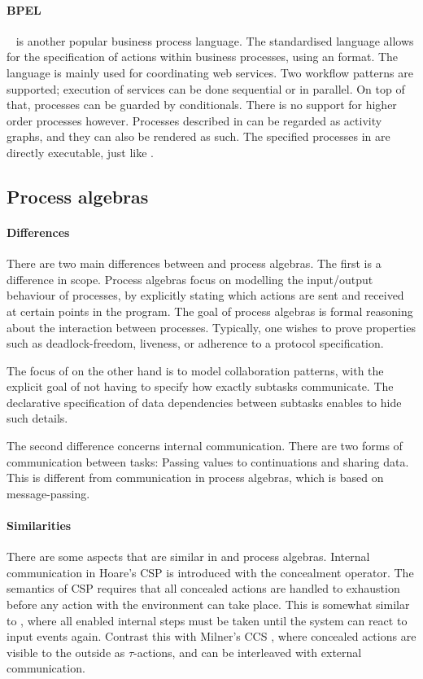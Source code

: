 \paragraph{BPEL}

\BPEL~\cite{bpel} is another popular business process language. The standardised
language allows for the specification of actions within business processes,
using an \XML format.
The language is mainly used for coordinating web services.
Two workflow patterns are supported; execution of services can be done sequential or in parallel.
On top of that, processes can be guarded by conditionals.
There is no support for higher order processes however.
Processes described in \BPEL can be regarded as activity graphs, and they can also be rendered as such.
The specified processes in \BPEL are directly executable, just like \YAWL.



\subsection{Process algebras}

\paragraph{Differences}
There are two main differences between \TOP and process algebras.
The first is a difference in scope.
Process algebras focus on modelling the input/output behaviour of processes, by explicitly stating which actions are sent and received at certain points in the program.
The goal of process algebras is formal reasoning about the interaction between processes.
Typically, one wishes to prove properties such as deadlock-freedom, liveness, or adherence to a protocol specification.

The focus of \TOP on the other hand is to model collaboration patterns, with the explicit goal of not having to specify how exactly subtasks communicate.
The declarative specification of data dependencies between subtasks enables \TOP to hide such details.

The second difference concerns internal communication.
There are two forms of communication between tasks: Passing values to continuations and sharing data.
This is different from communication in process algebras, which is based on message-passing.


\paragraph{Similarities}
There are some aspects that are similar in \TOPHAT and process algebras.
Internal communication in Hoare's CSP \cite{books/Hoare85CSP} is introduced with the concealment operator.
The semantics of CSP requires that all concealed actions are handled to exhaustion before any action with the environment can take place.
This is somewhat similar to \TOPHAT, where all enabled internal steps must be taken until the system can react to input events again.
Contrast this with Milner's CCS \cite{books/Milner89CAC}, where concealed actions are visible to the outside as $\tau$-actions, and can be interleaved with external communication.

